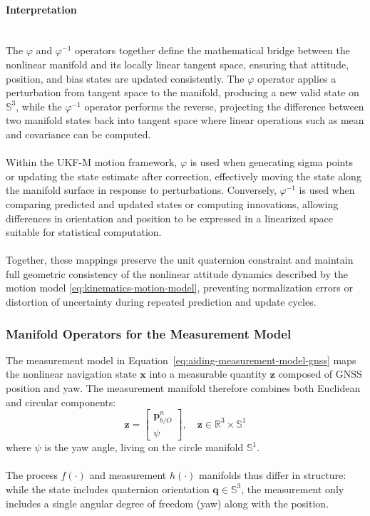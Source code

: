 \paragraph{Interpretation} \mbox{}\\[0.5em] \noindent
The $\varphi$ and $\varphi^{-1}$ operators together define the mathematical bridge between the nonlinear manifold and its locally linear tangent space, ensuring that attitude, position, and bias states are updated consistently. The $\varphi$ operator applies a perturbation from tangent space to the manifold, producing a new valid state on $\mathbb{S}^3$, while the $\varphi^{-1}$ operator performs the reverse, projecting the difference between two manifold states back into tangent space where linear operations such as mean and covariance can be computed.
\\ \\
Within the UKF-M motion framework, $\varphi$ is used when generating sigma points or updating the state estimate after correction, effectively moving the state along the manifold surface in response to perturbations. Conversely, $\varphi^{-1}$ is used when comparing predicted and updated states or computing innovations, allowing differences in orientation and position to be expressed in a linearized space suitable for statistical computation.
\\ \\
Together, these mappings preserve the unit quaternion constraint and maintain full geometric consistency of the nonlinear attitude dynamics described by the motion model \ref{eq:kinematics-motion-model}, preventing normalization errors or distortion of uncertainty during repeated prediction and update cycles.



\subsubsection{Manifold Operators for the Measurement Model}
The measurement model in Equation~\ref{eq:aiding-measurement-model-gnss} maps the nonlinear navigation state $\mathbf{x}$ into a measurable quantity $\mathbf{z}$ composed of GNSS position and yaw. The measurement manifold therefore combines both Euclidean and circular components:
$$
    \mathbf{z} =
    \begin{bmatrix}
        \mathbf{p}_{b/O}^{n} \\
        \psi
    \end{bmatrix},
    \quad
    \mathbf{z} \in \mathbb{R}^3 \times \mathbb{S}^1
$$
where $\psi$ is the yaw angle, living on the circle manifold $\mathbb{S}^1$. 
\\ \\
The process $f(\cdot)$ and measurement $h(\cdot)$ manifolds thus differ in structure: while the state includes quaternion orientation $\mathbf{q} \in \mathbb{S}^3$, the measurement only includes a single angular degree of freedom (yaw) along with the position.  

